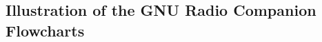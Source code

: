 



\newpage
\subsection{Illustration of the GNU Radio Companion Flowcharts}
\label{sec:4:IllustrationFlowcharts}


